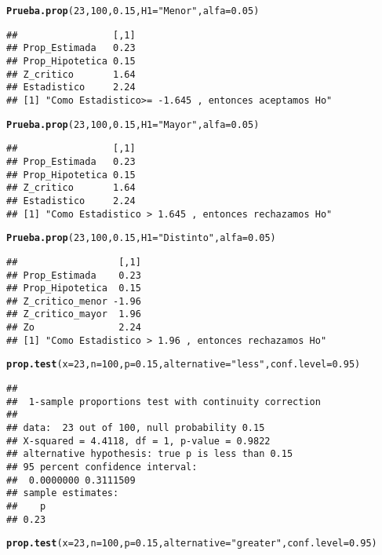 \documentclass{article}\usepackage[]{graphicx}\usepackage[]{color}
\makeatletter
\newcommand{\hlnum}[1]{\textcolor[rgb]{0.686,0.059,0.569}{#1}}%
\newcommand{\hlstr}[1]{\textcolor[rgb]{0.192,0.494,0.8}{#1}}%
\newcommand{\hlstd}[1]{\textcolor[rgb]{0.345,0.345,0.345}{#1}}%
\newcommand{\hlkwc}[1]{\textcolor[rgb]{0.333,0.667,0.333}{#1}}%
\newcommand{\hlkwd}[1]{\textcolor[rgb]{0.737,0.353,0.396}{\textbf{#1}}}%
\newenvironment{kframe}{%
 \def\at@end@of@kframe{}%
 \ifinner\ifhmode%
  \def\at@end@of@kframe{\end{minipage}}%
  \begin{minipage}{\columnwidth}%
 \fi\fi%
 \def\FrameCommand##1{\hskip\@totalleftmargin \hskip-\fboxsep
 \colorbox{shadecolor}{##1}\hskip-\fboxsep
     \hskip-\linewidth \hskip-\@totalleftmargin \hskip\columnwidth}%
 \MakeFramed {\advance\hsize-\width
   \@totalleftmargin\z@ \linewidth\hsize
   \@setminipage}}%
 {\par\unskip\endMakeFramed%
 \at@end@of@kframe}
\newenvironment{knitrout}{}{} %
\makeatother
\begin{document}
\begin{knitrout}
\begin{kframe}
\begin{alltt}
\hlkwd{Prueba.prop}\hlstd{(}\hlnum{23}\hlstd{,} \hlnum{100}\hlstd{,} \hlnum{0.15}\hlstd{,} \hlkwc{H1}\hlstd{=}\hlstr{"Menor"}\hlstd{,} \hlkwc{alfa}\hlstd{=}\hlnum{0.05}\hlstd{)}
\end{alltt}
\begin{verbatim}
##                 [,1]
## Prop_Estimada   0.23
## Prop_Hipotetica 0.15
## Z_critico       1.64
## Estadistico     2.24
## [1] "Como Estadistico>= -1.645 , entonces aceptamos Ho"
\end{verbatim}
\begin{alltt}
\hlkwd{Prueba.prop}\hlstd{(}\hlnum{23}\hlstd{,} \hlnum{100}\hlstd{,} \hlnum{0.15}\hlstd{,} \hlkwc{H1}\hlstd{=}\hlstr{"Mayor"}\hlstd{,} \hlkwc{alfa}\hlstd{=}\hlnum{0.05}\hlstd{)}
\end{alltt}
\begin{verbatim}
##                 [,1]
## Prop_Estimada   0.23
## Prop_Hipotetica 0.15
## Z_critico       1.64
## Estadistico     2.24
## [1] "Como Estadistico > 1.645 , entonces rechazamos Ho"
\end{verbatim}
\begin{alltt}
\hlkwd{Prueba.prop}\hlstd{(}\hlnum{23}\hlstd{,} \hlnum{100}\hlstd{,} \hlnum{0.15}\hlstd{,} \hlkwc{H1}\hlstd{=}\hlstr{"Distinto"}\hlstd{,} \hlkwc{alfa}\hlstd{=}\hlnum{0.05}\hlstd{)}
\end{alltt}
\begin{verbatim}
##                  [,1]
## Prop_Estimada    0.23
## Prop_Hipotetica  0.15
## Z_critico_menor -1.96
## Z_critico_mayor  1.96
## Zo               2.24
## [1] "Como Estadistico > 1.96 , entonces rechazamos Ho"
\end{verbatim}
\begin{alltt}
\hlkwd{prop.test}\hlstd{(}\hlkwc{x}\hlstd{=}\hlnum{23}\hlstd{,} \hlkwc{n}\hlstd{=}\hlnum{100}\hlstd{,} \hlkwc{p}\hlstd{=}\hlnum{0.15}\hlstd{,} \hlkwc{alternative}\hlstd{=}\hlstr{"less"}\hlstd{,} \hlkwc{conf.level}\hlstd{=}\hlnum{0.95}\hlstd{)}
\end{alltt}
\begin{verbatim}
## 
## 	1-sample proportions test with continuity correction
## 
## data:  23 out of 100, null probability 0.15
## X-squared = 4.4118, df = 1, p-value = 0.9822
## alternative hypothesis: true p is less than 0.15
## 95 percent confidence interval:
##  0.0000000 0.3111509
## sample estimates:
##    p 
## 0.23
\end{verbatim}
\begin{alltt}
\hlkwd{prop.test}\hlstd{(}\hlkwc{x}\hlstd{=}\hlnum{23}\hlstd{,} \hlkwc{n}\hlstd{=}\hlnum{100}\hlstd{,} \hlkwc{p}\hlstd{=}\hlnum{0.15}\hlstd{,} \hlkwc{alternative}\hlstd{=}\hlstr{"greater"}\hlstd{,} \hlkwc{conf.level}\hlstd{=}\hlnum{0.95}\hlstd{)}

\end{alltt}
\end{kframe}
\end{knitrout}
\end{document}
